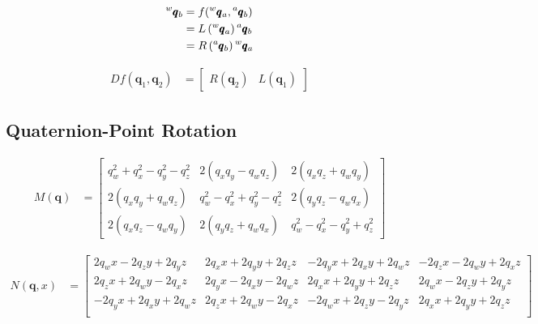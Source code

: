 \documentclass{article}
\begin{document}
\begin{align*}
	\prescript{w}{}{\pmb{q}}_b & = f(\prescript{w}{}{\pmb{q}}_a, \prescript{a}{}{\pmb{q}}_b)              \\
	                           & = L \left( \prescript{w}{}{\pmb{q}}_a \right) \prescript{a}{}{\pmb{q}}_b \\
	                           & = R \left( \prescript{a}{}{\pmb{q}}_b \right) \prescript{w}{}{\pmb{q}}_a \\
\end{align*}

\begin{align*}
	Df(\pmb{q}_1, \pmb{q}_2) & = \begin{bmatrix}
		                             R(\pmb{q}_2) & L(\pmb{q}_1)
	                             \end{bmatrix}
\end{align*}

\subsection{Quaternion-Point Rotation}

\begin{align*}
	M\left( \pmb{q} \right) & = \begin{bmatrix}
		                            q_w^2 + q_x^2 - q_y^2 - q_z^2 & 2(q_x q_y - q_w q_z)          & 2(q_x q_z + q_w q_y)          \\
		                            2(q_x q_y + q_w q_z)          & q_w^2 - q_x^2 + q_y^2 - q_z^2 & 2(q_y q_z - q_w q_x)          \\
		                            2(q_x q_z - q_w q_y)          & 2(q_y q_z + q_w q_x)          & q_w^2 - q_x^2 - q_y^2 + q_z^2
	                            \end{bmatrix}
\end{align*}

\begin{align*}
	N(\pmb{q}, x) & = \begin{bmatrix}
		                  2 q_w x - 2 q_z y + 2 q_y z  & 2 q_x x + 2 q_y y + 2 q_z z & -2 q_y x + 2 q_x y + 2 q_w z  & -2 q_z x - 2 q_w y + 2 q_x z \\
		                  2 q_z x + 2 q_w y - 2 q_x z  & 2 q_y x - 2 q_x y - 2 q_w z & 2 q_x x + 2 q_y y + 2 q_z z   & 2 q_w x - 2 q_z y + 2 q_y z  \\
		                  -2 q_y x + 2 q_x y + 2 q_w z & 2 q_z x + 2 q_w y - 2 q_x z & - 2 q_w x + 2 q_z y - 2 q_y z & 2 q_x x + 2 q_y y + 2 q_z z  \\
	                  \end{bmatrix}
\end{align*}
\end{document}
